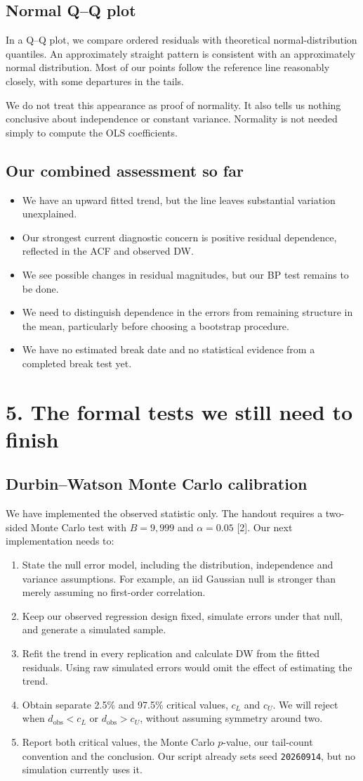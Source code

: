 \documentclass[11pt,a4paper]{article}
\newcommand{\heading}[1]{\section*{\sffamily\color{navy}#1}}
\newcommand{\subheading}[1]{\subsection*{\sffamily\color{navy}#1}}
\begin{document}
\subheading{Normal Q--Q plot}
In a Q--Q plot, we compare ordered residuals with theoretical normal-distribution quantiles. An approximately straight pattern is consistent with an approximately normal distribution. Most of our points follow the reference line reasonably closely, with some departures in the tails.

We do not treat this appearance as proof of normality. It also tells us nothing conclusive about independence or constant variance. Normality is not needed simply to compute the OLS coefficients.

\subheading{Our combined assessment so far}
\begin{itemize}
\item We have an upward fitted trend, but the line leaves substantial variation unexplained.
\item Our strongest current diagnostic concern is positive residual dependence, reflected in the ACF and observed DW.
\item We see possible changes in residual magnitudes, but our BP test remains to be done.
\item We need to distinguish dependence in the errors from remaining structure in the mean, particularly before choosing a bootstrap procedure.
\item We have no estimated break date and no statistical evidence from a completed break test yet.
\end{itemize}

\newpage
\heading{5. The formal tests we still need to finish}
\subheading{Durbin--Watson Monte Carlo calibration}
We have implemented the observed statistic only. The handout requires a two-sided Monte Carlo test with \textbf{$B=9{,}999$} and \textbf{$\alpha=0.05$} [2]. Our next implementation needs to:
\begin{enumerate}
\item State the null error model, including the distribution, independence and variance assumptions. For example, an iid Gaussian null is stronger than merely assuming no first-order correlation.
\item Keep our observed regression design fixed, simulate errors under that null, and generate a simulated sample.
\item Refit the trend in every replication and calculate DW from the fitted residuals. Using raw simulated errors would omit the effect of estimating the trend.
\item Obtain separate 2.5\% and 97.5\% critical values, $c_L$ and $c_U$. We will reject when $d_{\mathrm{obs}}<c_L$ or $d_{\mathrm{obs}}>c_U$, without assuming symmetry around two.
\item Report both critical values, the Monte Carlo $p$-value, our tail-count convention and the conclusion. Our script already sets seed \texttt{20260914}, but no simulation currently uses it.
\end{enumerate}
\end{document}
